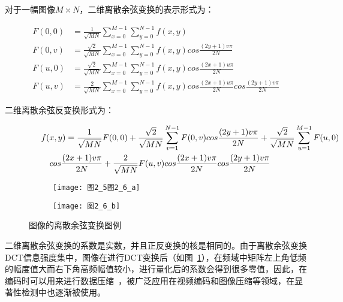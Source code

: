 对于一幅图像$M×N$，二维离散余弦变换的表示形式为：
\begin{linenomath}
\begin{align}
F(0,0) &= \frac{1}{\sqrt{MN}}\sum_{x=0}^{M-1}\sum_{y=0}^{N-1}f(x,y)\label{式2_23}\\
F(0,v) &= \frac{\sqrt{2}}{\sqrt{MN}}\sum_{x=0}^{M-1}\sum_{y=0}^{N-1}f(x,y)cos\frac{(2y+1)v\pi}{2N}\label{式2_24}\\
F(u,0) &= \frac{\sqrt{2}}{\sqrt{MN}}\sum_{x=0}^{M-1}\sum_{y=0}^{N-1}f(x,y)cos\frac{(2x+1)u\pi}{2N}\label{式2_25}\\
F(u,v) &= \frac{2}{\sqrt{MN}}\sum_{x=0}^{M-1}\sum_{y=0}^{N-1}f(x,y)cos\frac{(2x+1)u\pi}{2N}cos\frac{(2y+1)v\pi}{2N}\label{式2_26}
\end{align}
\end{linenomath}
二维离散余弦反变换形式为：
\begin{linenomath}
\begin{align}
\lefteqn{ f(x,y)=\frac{1}{\sqrt{MN}}F(0,0)+\frac{\sqrt{2}}{\sqrt{MN}}\sum_{v=1}^{N-1}F(0,v)cos\frac{(2y+1)v\pi}{2N}+\frac{\sqrt{2}}{\sqrt{MN}}\sum_{u=1}^{M-1}F(u,0){} }\nonumber\\
& & {}cos\frac{(2x+1)v\pi}{2N}+\frac{2}{\sqrt{MN}}F(u,v)cos\frac{(2x+1)v\pi}{2N}cos\frac{(2y+1)v\pi}{2N}
\label{式2_27}
\end{align}
\end{linenomath}

\begin{figure}[t]
  \centering%
  \begin{subfigure}{3cm}
    \texttt{[image: 图2\_5图2\_6\_a]}
  \end{subfigure}
  \hspace{4em}%
  \begin{subfigure}{0.25\textwidth}
    \texttt{[image: 图2\_6\_b]}
  \end{subfigure}
  \caption{图像的离散余弦变换图例}
  \label{图2_6}
\end{figure}

二维离散余弦变换的系数是实数，并且正反变换的核是相同的。由于离散余弦变换DCT信息强度集中，图像在进行DCT变换后（如图~\ref{图2_6}），在频域中矩阵左上角低频的幅度值大而右下角高频幅值较小，进行量化后的系数会得到很多零值，因此，在编码时可以用来进行数据压缩~\cite{Rao2014book}，被广泛应用在视频编码和图像压缩等领域，在显著性检测中也逐渐被使用。

